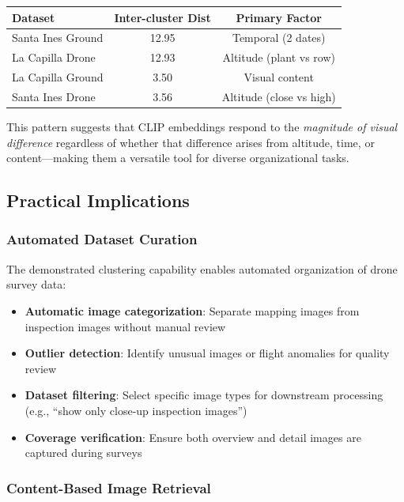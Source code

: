 \begin{center}
\begin{tabular}{lcc}
\toprule
\textbf{Dataset} & \textbf{Inter-cluster Dist} & \textbf{Primary Factor} \\
\midrule
Santa Ines Ground & 12.95 & Temporal (2 dates) \\
La Capilla Drone & 12.93 & Altitude (plant vs row) \\
La Capilla Ground & 3.50 & Visual content \\
Santa Ines Drone & 3.56 & Altitude (close vs high) \\
\bottomrule
\end{tabular}
\end{center}

This pattern suggests that CLIP embeddings respond to the \emph{magnitude of visual difference} regardless of whether that difference arises from altitude, time, or content---making them a versatile tool for diverse organizational tasks.

\subsection{Practical Implications}

\subsubsection{Automated Dataset Curation}

The demonstrated clustering capability enables automated organization of drone survey data:

\begin{itemize}
    \item \textbf{Automatic image categorization}: Separate mapping images from inspection images without manual review
    \item \textbf{Outlier detection}: Identify unusual images or flight anomalies for quality review
    \item \textbf{Dataset filtering}: Select specific image types for downstream processing (e.g., ``show only close-up inspection images'')
    \item \textbf{Coverage verification}: Ensure both overview and detail images are captured during surveys
\end{itemize}

\subsubsection{Content-Based Image Retrieval}

